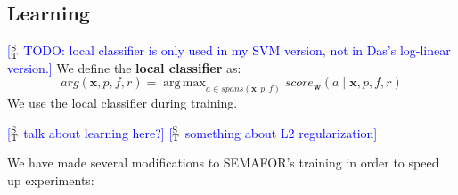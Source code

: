 \documentclass[11pt,a4paper]{article}
\DeclareMathOperator*{\argmax}{arg\,max}
\newcommand{\ensuretext}[1]{#1}
\newcommand{\nssmarker}{\ensuretext{\textcolor{magenta}{\ensuremath{^{\textsc{NS}}_{\textsc{S}}}}}}
\newcommand{\stmarker}{\ensuretext{\textcolor{blue}{\ensuremath{^{\textsc{S}}_{\textsc{T}}}}}}
\newcommand{\arkcomment}[3]{\ensuretext{\textcolor{#3}{[#1 #2]}}}
\newcommand{\nss}[1]{\arkcomment{\nssmarker}{#1}{magenta}}
\newcommand{\st}[1]{\arkcomment{\stmarker}{#1}{blue}}
\begin{document}
\subsection{Learning}
\label{sec:learning}

\st{TODO: local classifier is only used in my SVM version, not in Das's log-linear version.}
We define the \textbf{local classifier} as:
\begin{equation}
\textit{arg}(\mathbf{x}, p, f, r) = \argmax_{a \in \textit{spans}(\mathbf{x}, p, f)%
} \textit{score}_{\mathbf{w}}(a \mid \mathbf{x}, p, f, r)
\end{equation}
We use the local classifier during training.

\st{talk about learning here?}
\st{something about L2 regularization}




We have made several modifications to SEMAFOR's training in order to speed up experiments:
\end{document}
